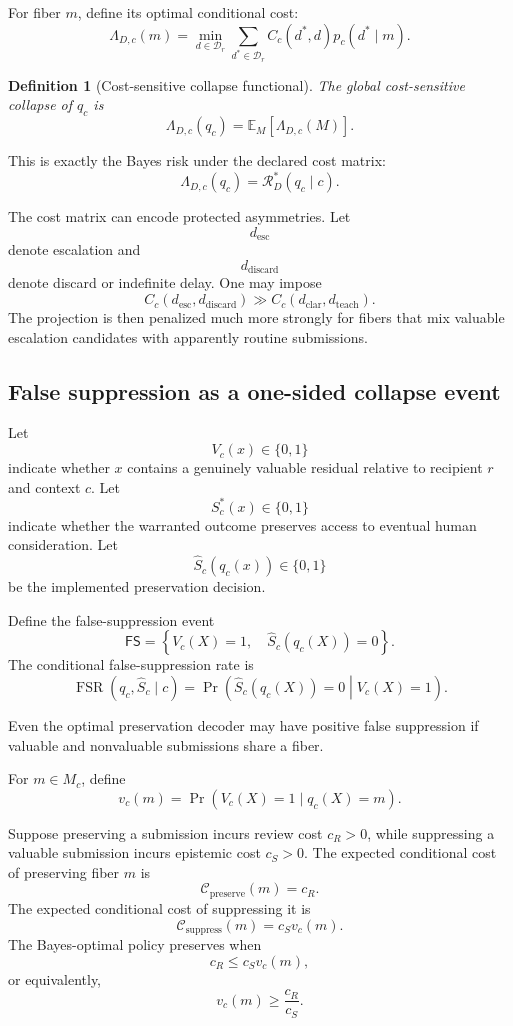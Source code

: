 \documentclass[11pt]{article}
\newtheorem{definition}{Definition}[section]
\theoremstyle{definition}
\DeclareMathOperator{\Prob}{Pr}
\newcommand{\E}{\mathbb{E}}
\begin{document}
For fiber \(m\), define its optimal conditional cost:
\[
\Lambda_{D,c}(m)
=
\min_{d\in\mathcal D_r}
\sum_{d^{*}\in\mathcal D_r}
C_c(d^{*},d)
p_c(d^{*}\mid m).
\]

\begin{definition}[Cost-sensitive collapse functional]
The global cost-sensitive collapse of \(q_c\) is
\[
\Lambda_{D,c}(q_c)
=
\E_M[\Lambda_{D,c}(M)].
\]
\end{definition}

This is exactly the Bayes risk under the declared cost matrix:
\[
\Lambda_{D,c}(q_c)
=
\mathcal R_D^{*}(q_c\mid c).
\]

The cost matrix can encode protected asymmetries. Let
\[
d_{\mathrm{esc}}
\]
denote escalation and
\[
d_{\mathrm{discard}}
\]
denote discard or indefinite delay. One may impose
\[
C_c(d_{\mathrm{esc}},d_{\mathrm{discard}})
\gg
C_c(d_{\mathrm{clar}},d_{\mathrm{teach}}).
\]
The projection is then penalized much more strongly for fibers that mix valuable escalation candidates with apparently routine submissions.

\subsection{False suppression as a one-sided collapse event}

Let
\[
V_c(x)\in\{0,1\}
\]
indicate whether \(x\) contains a genuinely valuable residual relative to recipient \(r\) and context \(c\). Let
\[
S_c^{*}(x)\in\{0,1\}
\]
indicate whether the warranted outcome preserves access to eventual human consideration. Let
\[
\widehat S_c(q_c(x))\in\{0,1\}
\]
be the implemented preservation decision.

Define the false-suppression event
\[
\mathsf{FS}
=
\left\{
V_c(X)=1,
\quad
\widehat S_c(q_c(X))=0
\right\}.
\]
The conditional false-suppression rate is
\[
\operatorname{FSR}(q_c,\widehat S_c\mid c)
=
\Prob
\left(
\widehat S_c(q_c(X))=0
\middle|
V_c(X)=1
\right).
\]

Even the optimal preservation decoder may have positive false suppression if valuable and nonvaluable submissions share a fiber.

For \(m\in M_c\), define
\[
v_c(m)
=
\Prob(V_c(X)=1\mid q_c(X)=m).
\]

Suppose preserving a submission incurs review cost \(c_R>0\), while suppressing a valuable submission incurs epistemic cost \(c_S>0\). The expected conditional cost of preserving fiber \(m\) is
\[
\mathcal C_{\mathrm{preserve}}(m)
=
c_R.
\]
The expected conditional cost of suppressing it is
\[
\mathcal C_{\mathrm{suppress}}(m)
=
c_S v_c(m).
\]
The Bayes-optimal policy preserves when
\[
c_R
\leq
c_Sv_c(m),
\]
or equivalently,
\[
v_c(m)
\geq
\frac{c_R}{c_S}.
\]
\end{document}
